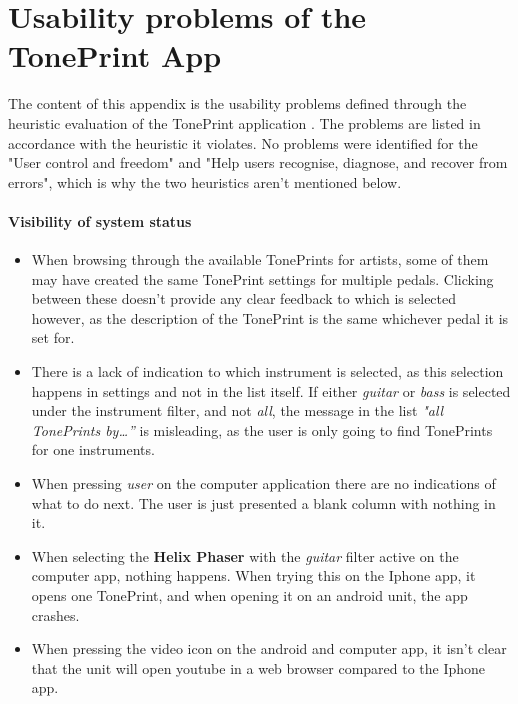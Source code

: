 \chapter{Usability problems of the TonePrint App}
\label{AppendixHeuristics}
The content of this appendix is the usability problems defined through the heuristic evaluation of the TonePrint application . The problems are listed in accordance with the heuristic it violates. No problems were identified for the "User control and freedom" and "Help users recognise, diagnose, and recover from errors", which is why the two heuristics aren't mentioned below.

\subsubsection{Visibility of system status}
\begin{itemize}
	\item When browsing through the available TonePrints for artists, some of them may have created the same TonePrint settings for multiple pedals. Clicking between these doesn’t provide any clear feedback to which is selected however, as the description of the TonePrint is the same whichever pedal it is set for.\\
	\item There is a lack of indication to which instrument is selected, as this selection happens in settings and not in the list itself. If either \textit{guitar} or \textit{bass} is selected under the instrument filter, and not \textit{all}, the message in the list \textit{"all TonePrints by…”} is misleading, as the user is only going to find TonePrints for one instruments.\\
	\item When pressing \textit{user} on the computer application there are no indications of what to do next. The user is just presented a blank column with nothing in it.\\
	\item When selecting the \textbf{Helix Phaser} with the \textit{guitar} filter active on the computer app, nothing happens. When trying this on the Iphone app, it opens one TonePrint, and when opening it on an android unit, the app crashes.\\
	\item When pressing the video icon on the android and computer app, it isn't clear that the unit will open youtube in a web browser compared to the Iphone app.
\end{itemize}
%

